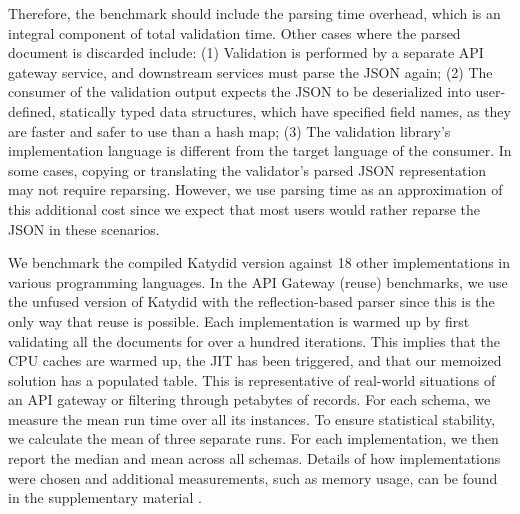 \documentclass[runningheads]{llncs}
\newcommand{\supplementarymaterial}{%
  supplementary material\xspace%
}
\newcommand{\JSON}{\ac{JSON}\xspace}
\begin{document}
Therefore, the benchmark should include the parsing time overhead, which is an integral component of total validation time.
Other cases where the parsed document is discarded include: (1) Validation is performed by a separate API gateway service, and downstream services must parse the \JSON again; (2) The consumer of the validation output expects the \JSON to be deserialized into user-defined, statically typed data structures, which have specified field names, as they are faster and safer to use than a hash map; (3) The validation library's implementation language is different from the target language of the consumer.
In some cases, copying or translating the validator's parsed \JSON representation may not require reparsing.
However, we use parsing time as an approximation of this additional cost since we expect that most users would rather reparse the \JSON in these scenarios.

We benchmark the compiled Katydid version against 18 other implementations in various programming languages.
In the API Gateway (reuse) benchmarks, we use the unfused version of Katydid with the reflection-based parser since this is the only way that reuse is possible.
Each implementation is warmed up by first validating all the documents for over a hundred iterations.
This implies that the CPU caches are warmed up, the JIT has been triggered, and that our memoized solution has a populated table.
This is representative of real-world situations of an API gateway or filtering through petabytes of records.
For each schema, we measure the mean run time over all its instances.
To ensure statistical stability, we calculate the mean of three separate runs.
For each implementation, we then report the median and mean across all schemas.
Details of how implementations were chosen and additional measurements, such as memory usage, can be found in the \supplementarymaterial.
\end{document}
